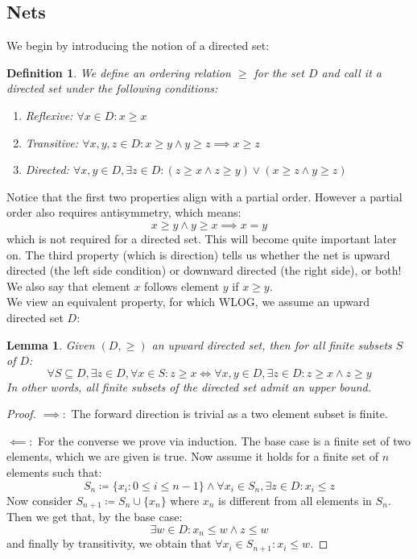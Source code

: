 \documentclass[10pt,letterpaper]{article} %
\newtheorem{lem}{Lemma}[section]
\newtheorem{defn}{Definition}[section]
\begin{document}
\subsection{Nets}
We begin by introducing the notion of a directed set:
\begin{defn}
We define an ordering relation $\geq$ for the set $D$ and call it a directed set under the following conditions:
\begin{enumerate}
\item Reflexive: $\forall x \in D: x \geq x$
\item Transitive: $\forall x, y, z \in D: x \geq y \land y \geq z \implies x \geq z$
\item Directed: $\forall x, y \in D, \exists z \in D: (z \geq x \land z \geq y) \lor (x \geq z \land y \geq z)$
\end{enumerate}
\end{defn}
Notice that the first two properties align with a partial order. However a partial order also requires antisymmetry, which means:
\begin{equation*}
x \geq y \land y \geq x \implies x = y
\end{equation*}
which is not required for a directed set. This will become quite important later on. The third property (which is direction) tells us whether the net is upward directed (the left side condition) or downward directed (the right side), or both!\\

We also say that element $x$ follows element $y$ if $x \geq y$.\\

We view an equivalent property, for which WLOG, we assume an upward directed set $D$:
\begin{lem}
Given $(D, \geq)$ an upward directed set, then for all finite subsets $S$ of $D$:
\begin{equation*}
\forall S \subseteq D, \exists z \in D, \forall x \in S: z \geq x \iff \forall x, y \in D, \exists z \in D: z \geq x \land z \geq y 
\end{equation*}
In other words, all finite subsets of the directed set admit an upper bound.
\end{lem}
\begin{proof}
$\implies:$ The forward direction is trivial as a two element subset is finite.

$\impliedby:$ For the converse we prove via induction. The base case is a finite set of two elements, which we are given is true. Now assume it holds for a finite set of $n$ elements such that:
\begin{equation*}
S_n \coloneq \{x_i: 0 \leqslant i \leqslant n-1\} \land \forall x_i \in S_n, \exists z \in D: x_i \leq z
\end{equation*}
Now consider $S_{n+1} \coloneq S_n \cup \{x_n\}$ where $x_n$ is different from all elements in $S_n$. Then we get that, by the base case:
\begin{equation*}
\exists w \in D: x_n \leq w \land z \leq w
\end{equation*}
and finally by transitivity, we obtain that $\forall x_i \in S_{n+1}: x_i \leq w$. 
\end{proof} 
\end{document}
